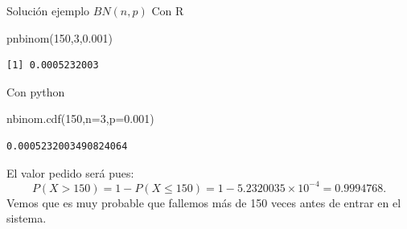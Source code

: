 \documentclass[
  ignorenonframetext,
  aspectratio=169]{beamer}
\newenvironment{Shaded}{\begin{snugshade}}{\end{snugshade}}
\newcommand{\DecValTok}[1]{\textcolor[rgb]{0.68,0.00,0.00}{#1}}
\newcommand{\FloatTok}[1]{\textcolor[rgb]{0.68,0.00,0.00}{#1}}
\newcommand{\FunctionTok}[1]{\textcolor[rgb]{0.28,0.35,0.67}{#1}}
\newcommand{\NormalTok}[1]{\textcolor[rgb]{0.00,0.23,0.31}{#1}}
\newcommand{\OperatorTok}[1]{\textcolor[rgb]{0.37,0.37,0.37}{#1}}
\begin{document}
\begin{frame}[fragile]{Solución ejemplo \(BN(n,p)\)}
\protect\hypertarget{soluciuxf3n-ejemplo-bnnp-1}{}
Con R

\begin{Shaded}
\begin{Highlighting}[]
\FunctionTok{pnbinom}\NormalTok{(}\DecValTok{150}\NormalTok{,}\DecValTok{3}\NormalTok{,}\FloatTok{0.001}\NormalTok{)}
\end{Highlighting}
\end{Shaded}

\begin{verbatim}
[1] 0.0005232003
\end{verbatim}

Con python

\begin{Shaded}
\begin{Highlighting}[]
\NormalTok{nbinom.cdf(}\DecValTok{150}\NormalTok{,n}\OperatorTok{=}\DecValTok{3}\NormalTok{,p}\OperatorTok{=}\FloatTok{0.001}\NormalTok{)}
\end{Highlighting}
\end{Shaded}

\begin{verbatim}
0.0005232003490824064
\end{verbatim}

El valor pedido será pues: \[
P(X>150)=1-P(X\leq 150)=1-\ensuremath{5.2320035\times 10^{-4}}=0.9994768.
\] Vemos que es muy probable que fallemos más de 150 veces antes de
entrar en el sistema.
\end{frame}
\end{document}
